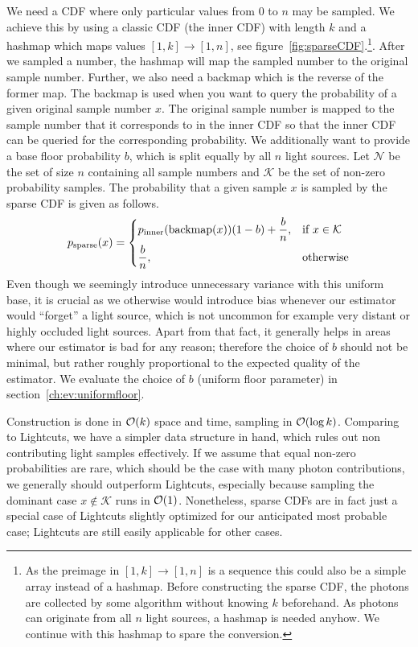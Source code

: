 We need a CDF where only particular values from $0$ to $n$ may be sampled. We achieve this by using a classic CDF (the inner CDF) with length $k$ and a hashmap which maps values $[1,k]\to [1,n]$, see figure~\ref{fig:sparseCDF}.\footnote{As the preimage in $[1,k]\to [1,n]$ is a sequence this could also be a simple array instead of a hashmap. Before constructing the sparse CDF, the photons are collected by some algorithm without knowing $k$ beforehand. As photons can originate from all $n$ light sources, a hashmap is needed anyhow. We continue with this hashmap to spare the conversion.}. After we sampled a number, the hashmap will map the sampled number to the original sample number. Further, we also need a backmap which is the reverse of the former map. The backmap is used when you want to query the probability of a given original sample number $x$. The original sample number is mapped to the sample number that it corresponds to in the inner CDF so that the inner CDF can be queried for the corresponding probability. We additionally want to provide a base floor probability $b$, which is split equally by all $n$ light sources. Let $\mathcal{N}$ be the set of size $n$ containing all sample numbers and $\mathcal{K}$ be the set of non-zero probability samples. The probability that a given sample $x$ is sampled by the sparse CDF is given as follows.
\begin{align}\label{eq:psparse}
 p_{\text{sparse}}(x) = 
\begin{dcases}
    p_{\text{inner}}(\text{backmap}(x))(1 - b) + \frac{b}{n},& \text{if } x \in \mathcal{K}\\
    \frac{b}{n}, & \text{otherwise}
\end{dcases}
\end{align}
Even though we seemingly introduce unnecessary variance with this uniform base, it is crucial as we otherwise would introduce bias whenever our estimator would \enquote{forget} a light source, which is not uncommon for example very distant or highly occluded light sources. Apart from that fact, it generally helps in areas where our estimator is bad for any reason; therefore the choice of $b$ should not be minimal, but rather roughly proportional to the expected quality of the estimator. We evaluate the choice of $b$ (uniform floor parameter) in section~\ref{ch:ev:uniformfloor}.

Construction is done in $\mathcal{O}(k)$ space and time, sampling in $\mathcal{O}(\log{k})$. Comparing to Lightcuts, we have a simpler data structure in hand, which rules out non contributing light samples effectively. If we assume that equal non-zero probabilities are rare, which should be the case with many photon contributions, we generally should outperform Lightcuts, especially because sampling the dominant case $x \notin \mathcal{K}$ runs in $\mathcal{O}(1)$. Nonetheless, sparse CDFs are in fact just a special case of Lightcuts slightly optimized for our anticipated most probable case; Lightcuts are still easily applicable for other cases. 

